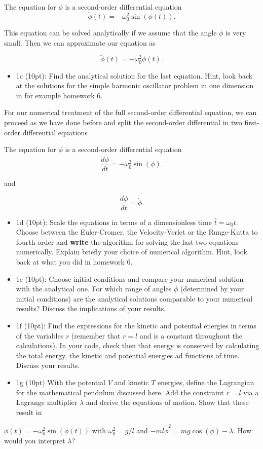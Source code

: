 \documentclass[%
oneside,                 %
final,                   %
10pt]{article}
\begin{document}
\noindent
The equation for $\phi$ is a second-order differential equation
\[
\ddot{\phi}(t)=-\omega_0^2\sin{(\phi(t))}.
\]

This equation can be solved analytically if we assume that the angle $\phi$ is very small. Then we can approximate our equation as

\[
\ddot{\phi}(t)=-\omega_0^2\phi(t).
\]

\begin{itemize}
\item 1c (10pt): Find the analytical solution for the last equation. Hint, look back at the solutions for the simple harmonic oscillator problem in one dimension in for example homework 6.
\end{itemize}

\noindent
For our numerical treatment of the full second-order differential  equation, we can proceed as we have done before and split the second-order differential in two first-order differential equations

The equation for $\phi$ is a second-order differential equation
\[
\frac{d\dot{\phi}}{dt}=-\omega_0^2\sin{(\phi)}.
\]

and

\[
\frac{d\phi}{dt}=\dot{\phi}.
\]


\begin{itemize}
\item 1d (10pt): Scale the equations in terms of a dimensionless time $\hat{t}=\omega_0t$. Choose between the Euler-Cromer, the Velocity-Verlet or the Runge-Kutta to fourth order and \textbf{write} the algorithm for solving the last two equations numerically. Explain briefly your choice of numerical algorithm. Hint, look back at what you did in homework 6.

\item 1e (10pt): Choose initial conditions and compare your numerical solution with the analytical one. For which range of angles $\phi$ (determined by your initial conditions) are the analytical solutions comparable to your numerical results? Discuss the implications of your results.

\item 1f (10pt): Find the expressions for the kinetic and potential energies in terms of the variables $r$ (remember that $r=l$ and is a constant throughout the calculations). In your code, check then that energy is conserved by calculating the total energy, the kinetic and potential energies ad functions of time. Discuss your results.

\item 1g (10pt) With the potential $V$  and kinetic $T$ energies, define the Lagrangian for the mathematical pendulum discussed here. Add the constraint $r=l$ via a Lagrange multiplier $\lambda$ and derive the equations of motion. Show that these result in 
\end{itemize}

\noindent
$\ddot{\phi}(t)=-\omega_0^2\sin{(\phi(t))}$ with $\omega_0^2=g/l$ and $-ml\dot{\phi}^2=mg\cos{(\phi)}-\lambda$.  How would you interpret $\lambda$? 

\end{document}
